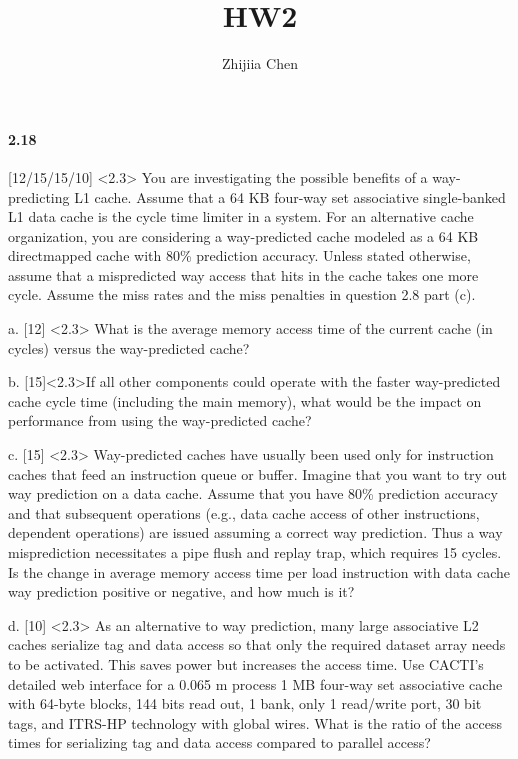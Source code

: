 \documentclass{article}
\title{HW2}
\author{Zhijiia Chen}
\begin{document}
\maketitle

\paragraph{2.18} [12/15/15/10] <2.3> You are investigating the possible benefits of a way-predicting L1 cache. Assume that a 64 KB four-way set associative single-banked L1 data cache is the cycle time limiter in a system. For an alternative cache organization, you are considering a way-predicted cache modeled as a 64 KB directmapped cache with 80\% prediction accuracy. Unless stated otherwise, assume that a mispredicted way access that hits in the cache takes one more cycle. Assume the miss rates and the miss penalties in question 2.8 part (c).

a. [12] <2.3> What is the average memory access time of the current cache (in cycles) versus the way-predicted cache?

b. [15]<2.3>If all other components could operate with the faster way-predicted cache cycle time (including the main memory), what would be the impact on performance from using the way-predicted cache?

c. [15] <2.3> Way-predicted caches have usually been used only for instruction caches that feed an instruction queue or buffer. Imagine that you want to try out way prediction on a data cache. Assume that you have 80\% prediction accuracy and that subsequent operations (e.g., data cache access of other instructions, dependent operations) are issued assuming a correct way prediction. Thus a way misprediction necessitates a pipe flush and replay trap, which requires 15 cycles. Is the change in average memory access time per load instruction with data cache way prediction positive or negative, and how much is it?

d. [10] <2.3> As an alternative to way prediction, many large associative L2 caches serialize tag and data access so that only the required dataset array needs to be activated. This saves power but increases the access time. Use CACTI’s detailed web interface for a 0.065 m process 1 MB four-way set associative cache with 64-byte blocks, 144 bits read out, 1 bank, only 1 read/write port, 30 bit tags, and ITRS-HP technology with global wires. What is the ratio of the access times for serializing tag and data access compared to parallel access?
\end{document}
